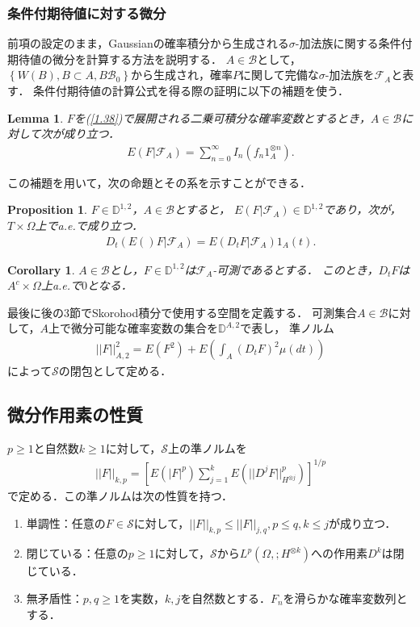 \documentclass[a4paper,10pt]{jsarticle}
\theoremstyle{plain}
\newtheorem{lemma}{Lemma}
\newtheorem{proposition}{Proposition}
\newtheorem{corollary}{Corollary}
\newcommand{\eq}[1]{\begin{align}#1\end{align}}
\newcommand{\enums}[1]{\begin{enumerate}#1\end{enumerate}}
\begin{document}
\subsubsection{条件付期待値に対する微分}
前項の設定のまま，Gaussianの確率積分から生成される$\sigma$-加法族に関する条件付期待値の微分を計算する方法を説明する．
$A\in\mathcal{B}$として，$\left\{W(B),B\subset A,B\mathcal{B}_0\right\}$から生成され，確率$P$に関して完備な$\sigma$-加法族を$\mathcal{F}_A$と表す．
条件付期待値の計算公式を得る際の証明に以下の補題を使う．
\begin{lemma}\label{lem1.2.5}
$F$を(\ref{1.38})で展開される二乗可積分な確率変数とするとき，$A\in\mathcal{B}$に対して次が成り立つ．
\eq{E\left(F|\mathcal{F}_A\right)=\sum^\infty_{n=0}I_n(f_n1_A^{\otimes n}).}
\end{lemma}
この補題を用いて，次の命題とその系を示すことができる．
\begin{proposition}\label{prop1.2.8}
$F\in\mathbb{D}^{1,2}$，$A\in\mathcal{B}$とすると，
$E\left(F|\mathcal{F}_A\right)\in\mathbb{D}^{1,2}$であり，次が，$T\times\Omega$上でa.e.で成り立つ．
\eq{D_t\left(E()F|\mathcal{F}_A\right)=E\left(D_tF|\mathcal{F}_A\right)1_A(t).}
\end{proposition}
\begin{corollary}\label{cor1.2.1}
$A\in\mathcal{B}$とし，$F\in\mathbb{D}^{1,2}$は$\mathcal{F}_A$-可測であるとする．
このとき，$D_tF$は$A^c\times\Omega$上a.e.で$0$となる．
\end{corollary}

最後に後の3節でSkorohod積分で使用する空間を定義する．
可測集合$A\in\mathcal{B}$に対して，$A$上で微分可能な確率変数の集合を$\mathbb{D}^{A,2}$で表し，
準ノルム
\eq{||F||^2_{A,2}=E(F^2)+E\left(\int_A\left(D_tF\right)^2\mu(dt)\right)}
によって$\mathcal{S}$の閉包として定める．

\subsection{微分作用素の性質}
$p\ge1$と自然数$k\ge1$に対して，$\mathcal{S}$上の準ノルムを
\eq{||F||_{k,p}=\left[E(|F|^p)\sum_{j=1}^kE\left(||D^jF||^p_{H^{\otimes j}}\right)\right]^{1/p}}
で定める．この準ノルムは次の性質を持つ．
\enums{
	\item 単調性：任意の$F\in\mathcal{S}$に対して，$||F||_{k,p}\le||F||_{j,q},p\le q,k\le j$が成り立つ．
	\item 閉じている：任意の$p\ge1$に対して，$\mathcal{S}$から$L^p\left(\Omega,;H^{\otimes k}\right)$への作用素$D^k$は閉じている．
	\item 無矛盾性：$p,q\ge1$を実数，$k,j$を自然数とする．$F_n$を滑らかな確率変数列とする．
}
\end{document}
